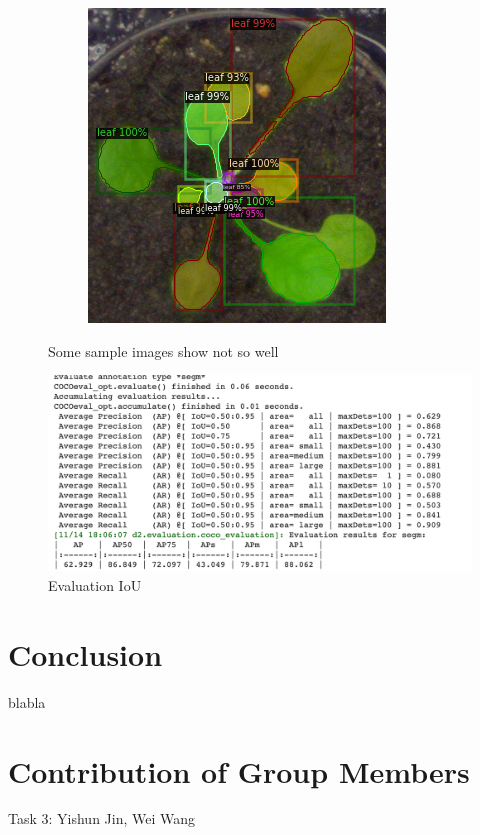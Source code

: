\documentclass[conference]{IEEEtran}
\begin{document}
\begin{figure}[h!]
\begin{subfigure}[h!]{0.24\textwidth}
\end{subfigure}
\hfill
\begin{subfigure}[h!]{0.24\textwidth}
    \centering
    \includegraphics[width=\textwidth]{img/ara2013_plant162.png}
\end{subfigure}
\caption{Some sample images show not so well}
\label{fig:bad_result}
\end{figure}

\begin{figure}[h]
    \centering
    \includegraphics[width=\linewidth]{img/iou_evl.png}
    \caption{Evaluation IoU}
    \label{fig_ap}
\end{figure}


\section{Conclusion}

blabla

\section{Contribution of Group Members}


Task 3:  Yishun Jin, Wei Wang




\end{document}
